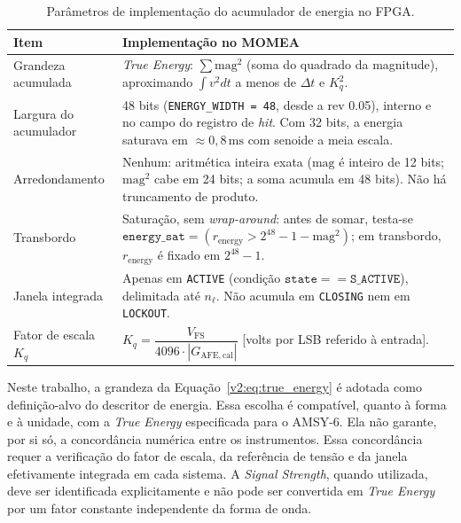 \begin{table}[htbp]
	\centering
	\caption{Parâmetros de implementação do acumulador de energia no FPGA.}
	\label{v2:tab:parametros_energia}
	\begin{tabularx}{\textwidth}{p{} X}
		\toprule
		\textbf{Item} & \textbf{Implementação no MOMEA} \\
		\midrule
		Grandeza acumulada & \textit{True Energy}: \(\sum \mathrm{mag}^2\) (soma do quadrado da magnitude), aproximando \(\int v^2 dt\) a menos de \(\Delta t\) e \(K_q^2\). \\
		Largura do acumulador & 48 bits (\texttt{ENERGY\_WIDTH = 48}, desde a rev 0.05), interno e no campo do registro de \textit{hit}. Com 32 bits, a energia saturava em \(\approx 0{,}8\,\mathrm{ms}\) com senoide a meia escala. \\
		Arredondamento & Nenhum: aritmética inteira exata (\(\mathrm{mag}\) é inteiro de 12 bits; \(\mathrm{mag}^2\) cabe em 24 bits; a soma acumula em 48 bits). Não há truncamento de produto. \\
		Transbordo & Saturação, sem \textit{wrap-around}: antes de somar, testa-se \(\texttt{energy\_sat} = (r_{\mathrm{energy}} > 2^{48}-1 - \mathrm{mag}^2)\); em transbordo, \(r_{\mathrm{energy}}\) é fixado em \(2^{48}-1\). \\
		Janela integrada & Apenas em \texttt{ACTIVE} (condição \(\texttt{state} == \texttt{S\_ACTIVE}\)), delimitada até \(n_\ell\). Não acumula em \texttt{CLOSING} nem em \texttt{LOCKOUT}. \\
		Fator de escala \(K_q\) & \(K_q = \dfrac{V_{\mathrm{FS}}}{4096 \cdot |G_{\mathrm{AFE,cal}}|}\) [volts por LSB referido à entrada]. \\
		\bottomrule
	\end{tabularx}
\end{table}

Neste trabalho, a grandeza da Equação~\eqref{v2:eq:true_energy} é adotada como definição-alvo do descritor de energia. Essa escolha é compatível, quanto à forma e à unidade, com a \textit{True Energy} especificada para o AMSY-6. Ela não garante, por si só, a concordância numérica entre os instrumentos. Essa concordância requer a verificação do fator de escala, da referência de tensão e da janela efetivamente integrada em cada sistema. A \textit{Signal Strength}, quando utilizada, deve ser identificada explicitamente e não pode ser convertida em \textit{True Energy} por um fator constante independente da forma de onda.

